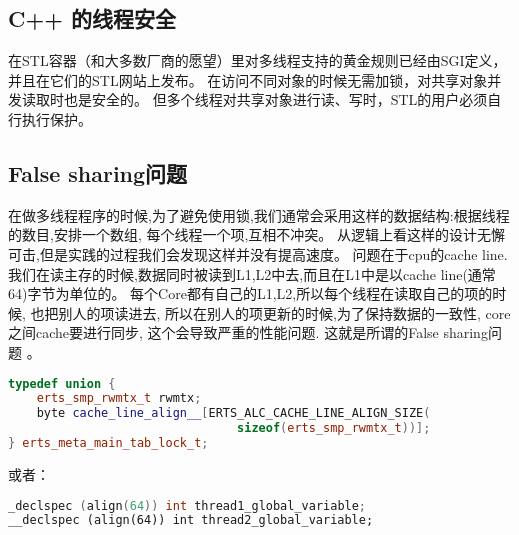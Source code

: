 \subsection{C++ 的线程安全}
在STL容器（和大多数厂商的愿望）里对多线程支持的黄金规则已经由SGI定义，并且在它们的STL网站上发布。
在访问不同对象的时候无需加锁，对共享对象并发读取时也是安全的。
但多个线程对共享对象进行读、写时，STL的用户必须自行执行保护。
 
 \subsection{False sharing问题}
在做多线程程序的时候,为了避免使用锁,我们通常会采用这样的数据结构:根据线程的数目,安排一个数组, 每个线程一个项,互相不冲突。
从逻辑上看这样的设计无懈可击,但是实践的过程我们会发现这样并没有提高速度。
问题在于cpu的cache line. 我们在读主存的时候,数据同时被读到L1,L2中去,而且在L1中是以cache line(通常64)字节为单位的。
每个Core都有自己的L1,L2,所以每个线程在读取自己的项的时候, 也把别人的项读进去, 所以在别人的项更新的时候,为了保持数据的一致性, core之间cache要进行同步, 这个会导致严重的性能问题. 这就是所谓的False sharing问题 。
\begin{lstlisting}[language=C++]                      
typedef union {
    erts_smp_rwmtx_t rwmtx;
    byte cache_line_align__[ERTS_ALC_CACHE_LINE_ALIGN_SIZE(
                                sizeof(erts_smp_rwmtx_t))];
} erts_meta_main_tab_lock_t;
\end{lstlisting}

或者：
\begin{lstlisting}[language=C++]                      
_declspec (align(64)) int thread1_global_variable;
__declspec (align(64)) int thread2_global_variable;
\end{lstlisting}
 
 








